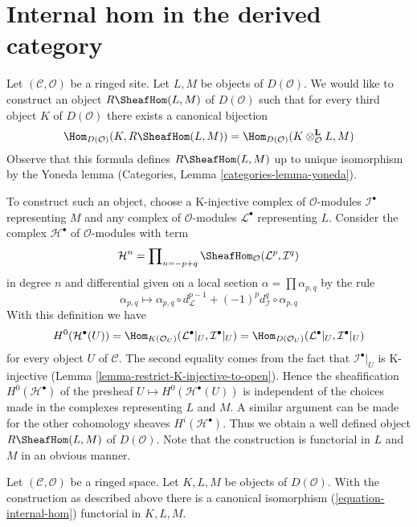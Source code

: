 \section{Internal hom in the derived category}
\label{section-internal-hom}

\noindent
Let $(\mathcal{C}, \mathcal{O})$ be a ringed site. Let $L, M$ be objects
of $D(\mathcal{O})$. We would like to construct an object
$R\SheafHom(L, M)$ of $D(\mathcal{O})$ such that for every third
object $K$ of $D(\mathcal{O})$ there exists a canonical bijection
\begin{equation}
\label{equation-internal-hom}
\Hom_{D(\mathcal{O})}(K, R\SheafHom(L, M))
=
\Hom_{D(\mathcal{O})}(K \otimes_\mathcal{O}^\mathbf{L} L, M)
\end{equation}
Observe that this formula defines $R\SheafHom(L, M)$ up to unique
isomorphism by the Yoneda lemma
(Categories, Lemma \ref{categories-lemma-yoneda}).

\medskip\noindent
To construct such an object, choose a K-injective complex of
$\mathcal{O}$-modules $\mathcal{I}^\bullet$ representing $M$ and any
complex of $\mathcal{O}$-modules $\mathcal{L}^\bullet$ representing $L$.
Consider the complex $\mathcal{H}^\bullet$
of $\mathcal{O}$-modules with term
$$
\mathcal{H}^n =
\prod\nolimits_{n = - p + q}
\SheafHom_\mathcal{O}(\mathcal{L}^p, \mathcal{I}^q)
$$
in degree $n$ and differential given on a local section
$\alpha = \prod \alpha_{p, q}$ by the rule
$$
\alpha_{p, q}
\longmapsto
\alpha_{p, q} \circ d_{\mathcal{L}}^{p - 1} +
(-1)^pd_{\mathcal{I}}^q \circ \alpha_{p, q}
$$
With this definition we have
$$
H^0(\mathcal{H}^\bullet(U)) =
\Hom_{K(\mathcal{O}_U)}(\mathcal{L}^\bullet|_U, \mathcal{I}^\bullet|_U) =
\Hom_{D(\mathcal{O}_U)}(\mathcal{L}^\bullet|_U, \mathcal{I}^\bullet|_U)
$$
for every object $U$ of $\mathcal{C}$.
The second equality comes from the fact that $\mathcal{I}^\bullet|_U$
is K-injective (Lemma \ref{lemma-restrict-K-injective-to-open}).
Hence the sheafification $H^0(\mathcal{H}^\bullet)$ of the presheaf
$U \mapsto H^0(\mathcal{H}^\bullet(U))$ is independent of the choices
made in the complexes representing $L$ and $M$. A similar argument can
be made for the other cohomology sheaves $H^i(\mathcal{H}^\bullet)$.
Thus we obtain a well
defined object $R\SheafHom(L, M)$ of $D(\mathcal{O})$. Note that
the construction is functorial in $L$ and $M$ in an obvious manner.

\begin{lemma}
\label{lemma-internal-hom}
Let $(\mathcal{C}, \mathcal{O})$ be a ringed space. Let $K, L, M$ be objects
of $D(\mathcal{O})$. With the construction as described above
there is a canonical isomorphism (\ref{equation-internal-hom})
functorial in $K, L, M$.
\end{lemma}

